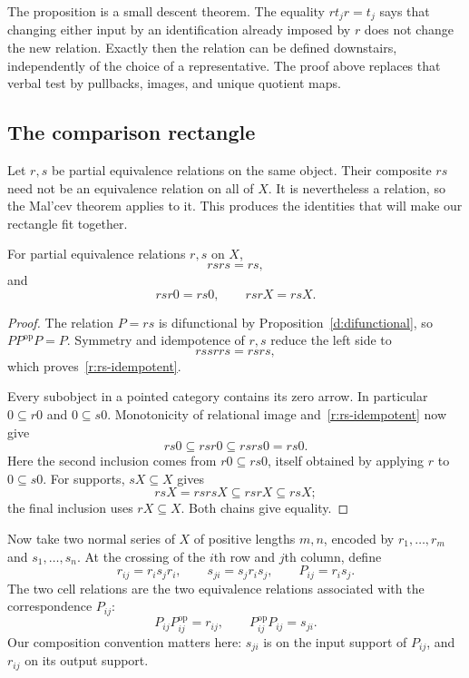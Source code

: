 The proposition is a small descent theorem.  The equality $rt_jr=t_j$
says that changing either input by an identification already imposed by
$r$ does not change the new relation.  Exactly then the relation can be
defined downstairs, independently of the choice of a representative.
The proof above replaces that verbal test by pullbacks, images, and
unique quotient maps.

\subsection{The comparison rectangle}

Let $r,s$ be partial equivalence relations on the same object.  Their
composite $rs$ need not be an equivalence relation on all of $X$.  It is
nevertheless a relation, so the Mal'cev theorem applies to it.  This
produces the identities that will make our rectangle fit together.

\begin{lemma}
\label{r:endpoint-identities}
For partial equivalence relations $r,s$ on $X$,
\begin{equation}
\label{r:rs-idempotent}
                  rsrs=rs,
\end{equation}
and
\begin{equation}
\label{r:endpoint-equalities}
                  rsr0=rs0,\qquad rsrX=rsX.
\end{equation}
\end{lemma}

\begin{proof}
The relation $P=rs$ is difunctional by Proposition~\ref{d:difunctional}, so
$PP^{\mathrm{op}}P=P$.  Symmetry and idempotence of $r,s$ reduce the left
side to
\[
           rssrrs=rsrs,
\]
which proves~\eqref{r:rs-idempotent}.

Every subobject in a pointed category contains its zero arrow.  In
particular $0\subseteq r0$ and $0\subseteq s0$.  Monotonicity of relational
image and~\eqref{r:rs-idempotent} now give
\[
 rs0\subseteq rsr0\subseteq rsrs0=rs0.
\]
Here the second inclusion comes from $r0\subseteq rs0$, itself obtained
by applying $r$ to $0\subseteq s0$.  For supports, $sX\subseteq X$ gives
\[
        rsX=rsrsX\subseteq rsrX\subseteq rsX;
\]
the final inclusion uses $rX\subseteq X$.  Both chains give equality.
\end{proof}

Now take two normal series of $X$ of positive lengths $m,n$, encoded by
$r_1,\ldots,r_m$ and $s_1,\ldots,s_n$.  At the crossing of the $i$th row
and $j$th column, define
\begin{equation}
\label{r:cells}
       r_{ij}=r_is_jr_i,\qquad
       s_{ji}=s_jr_is_j,\qquad P_{ij}=r_is_j.
\end{equation}
The two cell relations are the two equivalence relations associated with
the correspondence $P_{ij}$:
\[
       P_{ij}P_{ij}^{\mathrm{op}}=r_{ij},\qquad
       P_{ij}^{\mathrm{op}}P_{ij}=s_{ji}.
\]
Our composition convention matters here: $s_{ji}$ is on the input support
of $P_{ij}$, and $r_{ij}$ on its output support.

